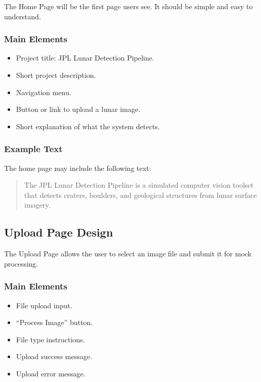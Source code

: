 \documentclass[12pt]{article}
\begin{document}
The Home Page will be the first page users see. It should be simple and easy to understand.

\subsubsection{Main Elements}

\begin{itemize}
    \item Project title: JPL Lunar Detection Pipeline.
    \item Short project description.
    \item Navigation menu.
    \item Button or link to upload a lunar image.
    \item Short explanation of what the system detects.
\end{itemize}

\subsubsection{Example Text}

The home page may include the following text:

\begin{quote}
The JPL Lunar Detection Pipeline is a simulated computer vision toolset that detects craters, boulders, and geological structures from lunar surface imagery.
\end{quote}

\subsection{Upload Page Design}

The Upload Page allows the user to select an image file and submit it for mock processing.

\subsubsection{Main Elements}

\begin{itemize}
    \item File upload input.
    \item ``Process Image'' button.
    \item File type instructions.
    \item Upload success message.
    \item Upload error message.
\end{itemize}
\end{document}
